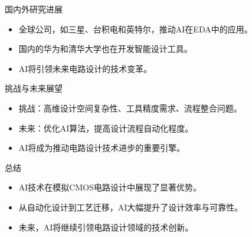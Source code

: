 \documentclass[xcolor=table,dvipsnames,svgnames,aspectratio=169]{ctexbeamer}
\begin{document}
\begin{frame}{国内外研究进展}
  \begin{itemize}
      \item 全球公司，如三星、台积电和英特尔，推动AI在EDA中的应用。
      \item 国内的华为和清华大学也在开发智能设计工具。
      \item AI将引领未来电路设计的技术变革。
  \end{itemize}
  \begin{center}
  \end{center}
\end{frame}

\begin{frame}{挑战与未来展望}
  \begin{itemize}
      \item 挑战：高维设计空间复杂性、工具精度需求、流程整合问题。
      \item 未来：优化AI算法，提高设计流程自动化程度。
      \item AI将成为推动电路设计技术进步的重要引擎。
  \end{itemize}
\end{frame}

\begin{frame}{总结}
  \begin{itemize}
      \item AI技术在模拟CMOS电路设计中展现了显著优势。
      \item 从自动化设计到工艺迁移，AI大幅提升了设计效率与可靠性。
      \item 未来，AI将继续引领电路设计领域的技术创新。
  \end{itemize}
  \begin{center}
  \end{center}
\end{frame}

\makebottom
\end{document}
